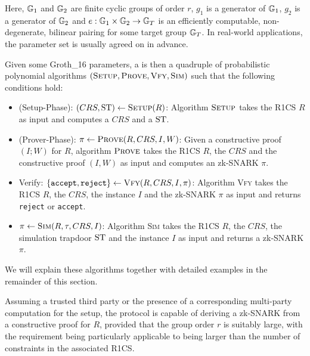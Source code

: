 Here, $\mathbb{G}_1$ and $\mathbb{G}_2$ are finite cyclic groups of order $r$, $g_1$ is a generator of $\mathbb{G}_1$, $g_2$ is a generator of $\mathbb{G}_2$ and $e: \mathbb{G}_1 \times \mathbb{G}_2 \to \mathbb{G}_T$ is an efficiently computable, non-degenerate, bilinear pairing for some target group $\mathbb{G}_T$. In real-world applications, the parameter set is usually agreed on in advance. 

Given some Groth\_16 parameters, a  is then a quadruple of probabilistic polynomial algorithms $(\textsc{Setup},\textsc{Prove},\textsc{Vfy},\textsc{Sim})$ such that the following conditions hold:
\begin{itemize}
\item (Setup-Phase): $(CRS,\mathrm{ST})\leftarrow \textsc{Setup}(R)$: Algorithm $\textsc{Setup}$ takes the R1CS $R$ as input and computes a  $CRS$ and a  $\mathrm{ST}$.
\item (Prover-Phase): $\pi\leftarrow \textsc{Prove}(R,CRS,I,W)$: Given a constructive proof $(I;W)$ for $R$, algorithm $\textsc{Prove}$ takes the R1CS $R$, the  $CRS$ and the constructive proof $(I,W)$ as input and computes an zk-SNARK $\pi$.
\item Verify: $\{\mathtt{accept},\mathtt{reject}\}\leftarrow \textsc{Vfy}(R,CRS,I,\pi)$:   Algorithm \textsc{Vfy} takes the R1CS $R$, the  $CRS$, the instance $I$ and the zk-SNARK $\pi$ as input and returns \texttt{reject} or \texttt{accept}.
\item $\pi\leftarrow \textsc{Sim}(R,\tau,CRS, I)$: Algorithm \textsc{Sim} takes the R1CS $R$, the  $CRS$, the simulation trapdoor $\mathrm{ST}$ and the instance $I$ as input and returns a zk-SNARK $\pi$. 
\end{itemize}
We will explain these algorithms together with detailed examples in the remainder of this section.

Assuming a trusted third party or the presence of a corresponding multi-party computation for the setup, the protocol is capable of deriving a zk-SNARK from a constructive proof for $R$, provided that the group order $r$ is suitably large, with the requirement being particularly applicable to being larger than the number of constraints in the associated R1CS.

